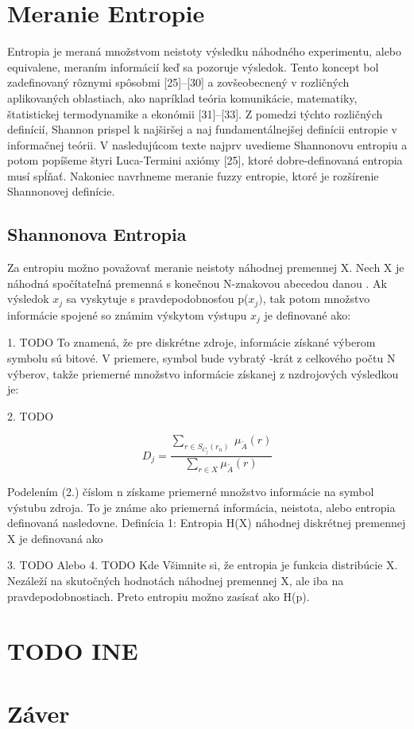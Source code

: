 





















\pagebreak
\section{Meranie Entropie}
Entropia je meraná množstvom neistoty výsledku náhodného experimentu, alebo equivalene, meraním informácií keď sa pozoruje výsledok. Tento koncept bol zadefinovaný rôznymi spôsobmi [25]–[30] a zovšeobecnený v rozličných aplikovaných oblastiach, ako napríklad teória komunikácie, matematiky, štatistickej termodynamike a ekonómii [31]–[33]. Z pomedzi týchto rozličných definícií, Shannon prispel k najširšej a naj fundamentálnejšej definícii entropie v informačnej teórii. V nasledujúcom texte najprv uvedieme Shannonovu entropiu a potom popíšeme štyri Luca-Termini axiómy [25], ktoré dobre-definovaná entropia musí spĺňať. Nakoniec navrhneme meranie fuzzy entropie, ktoré je rozšírenie Shannonovej definície.

\subsection{Shannonova Entropia}
Za entropiu možno považovať meranie neistoty náhodnej premennej X. Nech X je náhodná spočítateľná premenná s konečnou N-znakovou abecedou danou   .
Ak výsledok $x_j$ sa vyskytuje s pravdepodobnosťou p($x_j)$, tak potom množstvo informácie spojené so známim výskytom výstupu $x_j$ je definované ako:

1. TODO
To znamená, že pre diskrétne zdroje, informácie získané výberom symbolu sú bitové. V priemere, symbol  bude vybratý -krát z celkového počtu N výberov, takže priemerné množstvo informácie získanej z nzdrojových výsledkou je:

2. TODO 

\begin{equation}\label{fuzzy}
D_j = \frac{ \sum\limits_{r \in S_{C_{j}}(r_n)  } \: \mu_{\tilde{A}} (r) }{\sum\limits_{r \in X  } \mu_{\tilde{A}} (r) }
\end{equation}




Podelením (2.) číslom n získame priemerné množstvo informácie na symbol výstubu zdroja. To je známe ako priemerná informácia, neistota, alebo entropia definovaná nasledovne.
Definícia 1:  Entropia H(X) náhodnej diskrétnej premennej X je definovaná ako 

3. TODO
Alebo
4.	TODO
Kde
Všimnite si, že entropia je funkcia distribúcie X. Nezáleží na skutočných hodnotách náhodnej premennej X, ale iba na pravdepodobnostiach. Preto entropiu možno zasísať ako H(p).


\section{TODO INE }

\section{Záver}